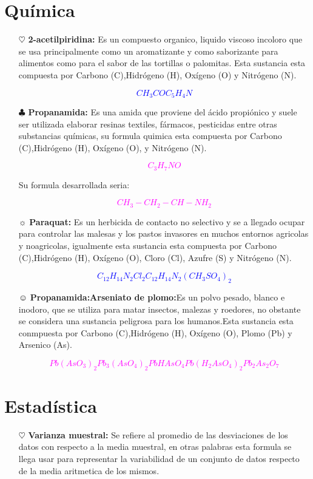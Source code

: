 \documentclass[letterpaper,12pt]{article}
\begin{document}
\begin{itemize}
\section{Química}
\begin{itemize}
    \item[$\heartsuit$]{\textbf{ 2-acetilpiridina:}} Es un compuesto organico, liquido viscoso incoloro que se usa principalmente como un aromatizante y como saborizante para alimentos como para el sabor de las tortillas o palomitas. Esta sustancia esta compuesta por Carbono (C),Hidrógeno (H), Oxígeno (O) y Nitrógeno (N).
    
    \textcolor{blue}{$$CH_3COC_5H_4N$$}
\item[$\clubsuit$]{\textbf {Propanamida:}} Es una amida que proviene del ácido propiónico y suele ser utilizada elaborar resinas textiles, fármacos, pesticidas entre otras substancias químicas, su formula quimica esta compuesta por Carbono (C),Hidrógeno (H), Oxígeno (O), y  Nitrógeno (N).

\textcolor{magenta}{$$C_3H_7NO$$}

Su formula desarrollada seria:

\textcolor{magenta}{$$CH_3-CH_2-CH-NH_2$$}
\item[$\sun$]{\textbf{Paraquat:}} Es un herbicida de contacto no selectivo y se a llegado ocupar para controlar las malesas y los pastos invasores en muchos entornos agricolas y noagricolas, igualmente esta sustancia esta compuesta por Carbono (C),Hidrógeno (H), Oxígeno (O), Cloro (Cl), Azufre (S) y  Nitrógeno (N).

\textcolor{blue}{$$C_{12}H_{14}N_2Cl_2C_{12}H_{14}N_2(CH_3SO_4)_2$$}

\item[$\smiley$]{\textbf{Propanamida:Arseniato de plomo:}}Es un polvo pesado, blanco e inodoro, que se utiliza para matar insectos, malezas y roedores, no obstante se considera una sustancia peligrosa para los humanos.Esta sustancia esta conmpuesta por Carbono (C),Hidrógeno (H), Oxígeno (O), Plomo (Pb) y Arsenico (As).

\textcolor{magenta}{$$Pb(AsO_3)_2Pb_3(AsO_4)_2PbHAsO_4Pb(H_2AsO_4)_2Pb_2As_2O_7$$}

\end{itemize}

\section{Estadística}
\begin{itemize}
    \item[$\heartsuit$]{\textbf{Varianza muestral:}} Se refiere al promedio de las desviaciones de los datos con respecto a la media muestral, en otras palabras esta formula se llega usar para representar la variabilidad de un conjunto de datos respecto de la media aritmetica de los mismos.
    

\end{itemize}
\end{itemize}
\end{document}
